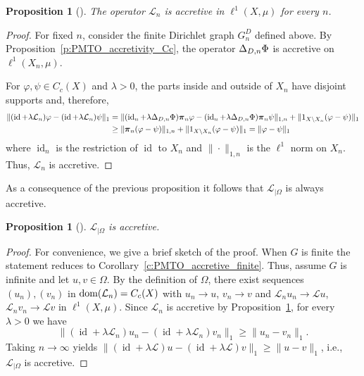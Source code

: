 \documentclass[letterpaper]{article}
\newtheorem{proposition}[lemma]{Proposition}
\theoremstyle{definition}
\theoremstyle{named}
\numberwithin{equation}{section}
\newcommand{\dom}{\textnormal{dom}} %
\newcommand{\id}{\operatorname{id}}
\newcommand{\Deltaphi}{\mathcal{L}}
\newcommand{\Deltaphiom}{\Deltaphi_{|\Omega}}
\newcommand{\Lmin}{\mathcal{L}_{n}}
\newcommand{\Deltadir}[1][]{\Delta_{D\ifx&#1&\else,#1\fi}}
\begin{document}
\begin{proposition}[{\cite[Corollary~B.4]{bianchi2022generalized}}]\label{prop:accretivity_lmin}
The operator $\Lmin$ is accretive in $\ell^1(X,\mu)$ for every $n$.
\end{proposition}
\begin{proof}
{
For fixed $n$, consider the finite Dirichlet graph $G_n^{D}$ defined
above. By
Proposition~\ref{p:PMTO_accretivity_Cc}, the operator
$\Deltadir[n]\Phi$ is accretive on $\ell^1(X_n,\mu)$.

For $\varphi,\psi\in C_c(X)$ and $\lambda>0$, the parts inside and outside of $X_n$ have disjoint supports and, therefore,
\[
 \begin{split}
 \|(\id+\lambda\Lmin)\varphi-(\id+\lambda\Lmin)\psi\|_1 &=\|(\id_n+\lambda\Deltadir[n]\Phi)\boldsymbol{\pi}_n\varphi
 -(\id_n+\lambda\Deltadir[n]\Phi)\boldsymbol{\pi}_n\psi\|_{1,n}
 +\|1_{X\setminus X_n}(\varphi-\psi)\|_1\\
 &\geq\|\boldsymbol{\pi}_n(\varphi-\psi)\|_{1,n}
 +\|1_{X\setminus X_n}(\varphi-\psi)\|_1
 =\|\varphi-\psi\|_1
 \end{split}
\]
where $\id_n$ is the restriction of $\id$ to $X_n$
and $\|\cdot\|_{1,n}$ is the $\ell^1$ norm on $X_n$.
Thus, $\Lmin$ is accretive.
}
\end{proof}

As a consequence of the previous proposition it follows that $\Deltaphiom$ is always accretive.

 \begin{proposition}[{\cite[Lemma~B.8]{bianchi2022generalized}}]\label{p:accretivityDeltaphiom}
   $\Deltaphiom$ is accretive.
 \end{proposition}
\begin{proof}
 For convenience, we give a brief sketch of the proof. When $G$ is finite the statement reduces to Corollary~\ref{c:PMTO_accretive_finite}. 
 Thus, assume $G$ is infinite and let $u,v\in\Omega$. By the definition of $\Omega$, there exist sequences $(u_n),(v_n)$ in $\dom(\Lmin)=C_c(X)$ with $u_n\to u$, $v_n\to v$ and $\Lmin u_n\to\Deltaphi u$, $\Lmin v_n\to\Deltaphi v$ in $\ell^1(X,\mu)$. Since $\Lmin$ is accretive by Proposition~\ref{prop:accretivity_lmin}, for every $\lambda > 0$ we have
$$ \|(\id+ \lambda\Lmin )u_n -(\id+ \lambda\Lmin ) v_n\|_1 \geq \|u_n - v_n\|_1.$$
Taking $n\to\infty$ yields $\|(\id+ \lambda\Deltaphi )u -(\id+ \lambda\Deltaphi) v\|_1 \geq \|u-v\|_1$, i.e.,\ $\Deltaphiom$ is accretive.
\end{proof}
\end{document}
